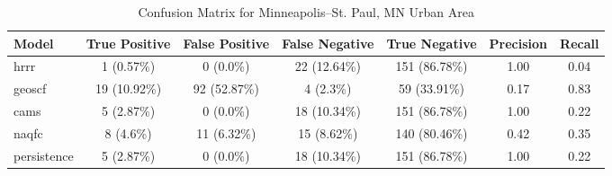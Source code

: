 \begin{table}[h!]
\centering
\begin{tabular}{lcccccc}
\hline
Model & True Positive & False Positive & False Negative & True Negative & Precision & Recall\\ \hline
hrrr & 1 (0.57\%) & 0 (0.0\%) & 22 (12.64\%) & 151 (86.78\%) & \cellcolor{green!25}1.00 & \cellcolor{red!25}0.04 \\ 
geoscf & 19 (10.92\%) & 92 (52.87\%) & 4 (2.3\%) & 59 (33.91\%) & \cellcolor{red!25}0.17 & \cellcolor{green!25}0.83 \\ 
cams & 5 (2.87\%) & 0 (0.0\%) & 18 (10.34\%) & 151 (86.78\%) & \cellcolor{green!25}1.00 & \cellcolor{green!25}0.22 \\ 
naqfc & 8 (4.6\%) & 11 (6.32\%) & 15 (8.62\%) & 140 (80.46\%) & \cellcolor{red!25}0.42 & \cellcolor{green!25}0.35 \\ 
persistence & 5 (2.87\%) & 0 (0.0\%) & 18 (10.34\%) & 151 (86.78\%) & 1.00 & 0.22 \\ 
\hline
\end{tabular}
\caption{Confusion Matrix for Minneapolis--St. Paul, MN Urban Area}
\end{table}
